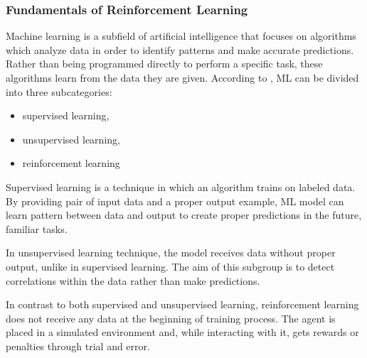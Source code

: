  \subsubsection{Fundamentals of Reinforcement Learning}
 Machine learning is a subfield of artificial intelligence that focuses on algorithms which analyze data in order to identify patterns and make accurate predictions. Rather than being programmed directly to perform a specific task, these algorithms learn from the data they are given.
 According to \cite{Deep-Learning-book}, ML can be divided into three subcategories:
 	\begin{itemize}
 		\item supervised learning,
 		\item unsupervised learning,
 		\item reinforcement learning 
 	\end{itemize}
 	
	Supervised learning is a technique in which an algorithm trains on labeled data. By providing pair of input data and a proper output example, ML model can learn pattern between data and output to create proper predictions in the future, familiar tasks. 
	
	In unsupervised learning technique, the model receives data without proper output, unlike in supervised learning. The aim of this subgroup is to detect correlations within the data rather than make predictions.
	
	In contrast to  both supervised and unsupervised learning, reinforcement learning does not receive any data at the beginning of training process. The agent is placed in a simulated environment and, while interacting with it, gets rewards or penalties through trial and error.
 	  

